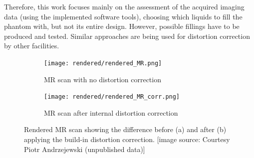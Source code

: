 Therefore, this work focuses mainly on the assessment of the acquired imaging data (using the implemented software tools), choosing which liquids to fill the phantom with, but not its entire design.
However, possible fillings have to be produced and tested.
Similar approaches are being used for distortion correction by other facilities. \cite{Price2015, Petersch2004, Torfeh2015, Wang2004, Wang2004a, Mizowaki2000}


\begin{figure}[!thb]
\centering
  \begin{subfigure}[b]{0.49\textwidth}
  \centering
    \texttt{[image: rendered/rendered\_MR.png]}
    \caption{MR scan with no distortion correction}
    \label{fig:rendered_MR}
  \end{subfigure}
  \begin{subfigure}[b]{0.49\textwidth}
  \centering
      \texttt{[image: rendered/rendered\_MR\_corr.png]}
    \caption{MR scan after internal distortion correction}
    \label{fig:rendered_MR_corr}
  \end{subfigure}
  \caption{Rendered MR scan showing the difference before (a) and after (b) applying the build-in distortion correction. [image source: Courtesy Piotr Andrzejewski (unpublished data)]}
  \label{fig:rendered_dist}
\end{figure}


